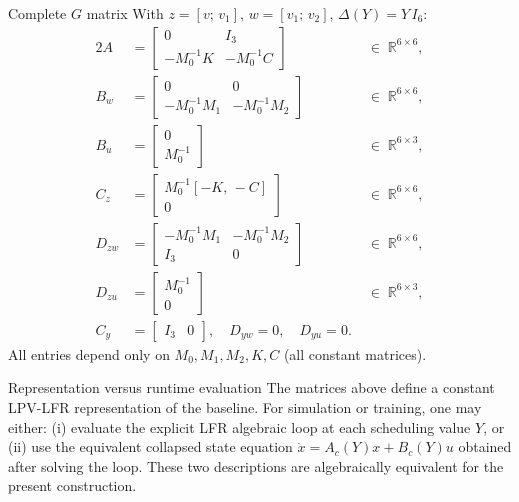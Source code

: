 \documentclass[11pt]{article}
\newcommand{\R}{\mathbb{R}}
\begin{document}
\medskip
\begin{resultbox}{Complete $G$ matrix}
With $z = [v;\,v_1]$, $w = [v_1;\,v_2]$, $\Delta(Y) = Y\,I_6$:
\begin{alignat}{2}
    A      &= \begin{bmatrix} 0 & I_3 \\ -M_0^{-1}K & -M_0^{-1}C \end{bmatrix}
             & \;\in\; \R^{6\times6}, \label{eq:A_fin}\\[4pt]
    B_w    &= \begin{bmatrix} 0 & 0 \\ -M_0^{-1}M_1 & -M_0^{-1}M_2 \end{bmatrix}
             & \;\in\; \R^{6\times6}, \label{eq:Bw_fin}\\[4pt]
    B_u    &= \begin{bmatrix} 0 \\ M_0^{-1} \end{bmatrix}
             & \;\in\; \R^{6\times3}, \label{eq:Bu_fin}\\[4pt]
    C_z    &= \begin{bmatrix} M_0^{-1}[-K,\,-C] \\ 0 \end{bmatrix}
             & \;\in\; \R^{6\times6}, \label{eq:Cz_fin}\\[4pt]
    D_{zw} &= \begin{bmatrix} -M_0^{-1}M_1 & -M_0^{-1}M_2 \\ I_3 & 0 \end{bmatrix}
             & \;\in\; \R^{6\times6}, \label{eq:Dzw_fin}\\[4pt]
    D_{zu} &= \begin{bmatrix} M_0^{-1} \\ 0 \end{bmatrix}
             & \;\in\; \R^{6\times3}, \label{eq:Dzu_fin}\\[4pt]
    C_y    &= \begin{bmatrix} I_3 & 0 \end{bmatrix}, \quad D_{yw} = 0, \quad D_{yu} = 0.
             & \label{eq:out_fin}
\end{alignat}
All entries depend only on $M_0, M_1, M_2, K, C$ (all constant matrices).
\end{resultbox}

\begin{notebox}{Representation versus runtime evaluation}
The matrices above define a constant LPV-LFR representation of the baseline.
For simulation or training, one may either:
(i) evaluate the explicit LFR algebraic loop at each scheduling value $Y$, or
(ii) use the equivalent collapsed state equation
$\dot{x} = A_c(Y)x + B_c(Y)u$ obtained after solving the loop.
These two descriptions are algebraically equivalent for the present construction.
\end{notebox}
\end{document}

